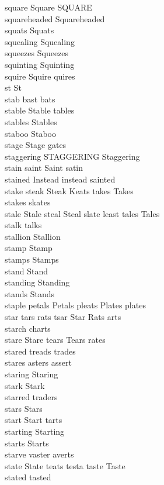 square Square SQUARE\\
squareheaded Squareheaded\\
squats Squats\\
squealing Squealing\\
squeezes Squeezes\\
squinting Squinting\\
squire Squire quires\\
st St\\
stab bast bats\\
stable Stable tables\\
stables Stables\\
staboo Staboo\\
stage Stage gates\\
staggering STAGGERING Staggering\\
stain saint Saint satin\\
stained Instead instead sainted\\
stake steak Steak Keats takes Takes\\
stakes skates\\
stale Stale steal Steal slate least tales Tales\\
stalk talks\\
stallion Stallion\\
stamp Stamp\\
stamps Stamps\\
stand Stand\\
standing Standing\\
stands Stands\\
staple petals Petals pleats Plates plates\\
star tars rats tsar Star Rats arts\\
starch charts\\
stare Stare tears Tears rates\\
stared treads trades\\
stares asters assert\\
staring Staring\\
stark Stark\\
starred traders\\
stars Stars\\
start Start tarts\\
starting Starting\\
starts Starts\\
starve vaster averts\\
state State teats testa taste Taste\\
stated tasted\\
